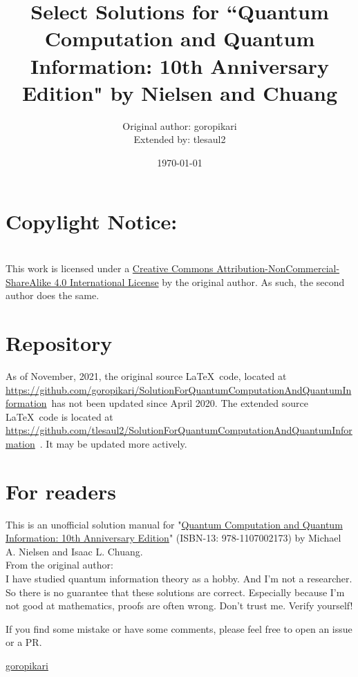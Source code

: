 \documentclass[11pt]{book}
\title{Select Solutions for ``Quantum Computation and Quantum Information: 10th Anniversary Edition" by Nielsen and Chuang}
\author{Original author: goropikari\\Extended by: tlesaul2}
\date{\today}
\begin{document}
\maketitle
\thispagestyle{empty}
\cleardoublepage
\thispagestyle{empty}
\setcounter{page}{1} %

\section*{Copylight Notice:}
\ccbyncsa\\
    This work is licensed under a \href{http://creativecommons.org/licenses/by-nc-sa/4.0/}{Creative Commons Attribution-NonCommercial-ShareAlike 4.0 International License} by the original author.  As such, the second author does the same.


\section*{Repository}
As of November, 2021, the original source \LaTeX \ code, located at \url{https://github.com/goropikari/SolutionForQuantumComputationAndQuantumInformation}\ has not been updated since April 2020.  The extended source \LaTeX \ code is located at \\ \url{https://github.com/tlesaul2/SolutionForQuantumComputationAndQuantumInformation}\ .  It may be updated more actively.

\section*{For readers}
This is an unofficial solution manual for "\href{http://www.cambridge.org/jp/academic/subjects/physics/quantum-physics-quantum-information-and-quantum-computation/quantum-computation-and-quantum-information-10th-anniversary-edition?format=HB&isbn=9781107002173#BBFv83H3ofgcgG3A.97}{Quantum Computation and Quantum Information: 10th Anniversary Edition}" (ISBN-13: 978-1107002173) by Michael A. Nielsen and Isaac L. Chuang.\\

\noindent From the original author:\\
\indent I have studied quantum information theory as a hobby.
And I'm not a researcher.
So there is no guarantee that these solutions are correct.
Especially because I'm not good at mathematics, proofs are often wrong.
Don't trust me. Verify yourself!

If you find some mistake or have some comments, please feel free to open an issue or a PR.
\begin{flushright}
\href{https://github.com/goropikari}{goropikari}\\
\end{flushright}
\end{document}
